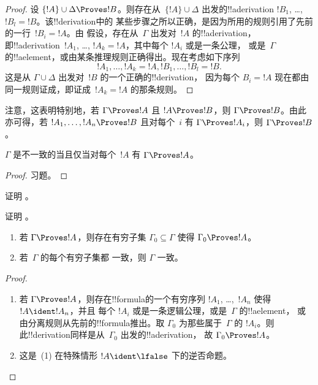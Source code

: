 \documentclass[../../../include/open-logic-section]{subfiles}
\begin{document}
\begin{proof}
  设 $\{!A\} \cup \Delta \Proves !B$。则存在从~$\{!A\} \cup
  \Delta$ 出发的!!a{derivation} $!B_1$, \dots, $!B_l = !B$。该!!{derivation}中的
  某些步骤之所以正确，是因为所用的规则引用了先前的一行~$!B_i = !A$。由
  假设，存在从~$\Gamma$ 出发对~$!A$ 的!!a{derivation}，即!!a{derivation}~$!A_1$, \dots, $!A_k = !A$，其中每个 $!A_i$ 或是一条公理，
  或是~$\Gamma$ 的!!a{element}，或由某条推理规则正确得出。现在考虑如下序列
  \[
  !A_1, \dots, !A_k = !A, !B_1, \dots, !B_l = !B.
  \]
  这是从 $\Gamma \cup \Delta$ 出发对~$!B$ 的一个正确的!!{derivation}，
  因为每个 $B_i = !A$ 现在都由同一规则证成，即证成~$!A_k = !A$ 的那条规则。
\end{proof}

注意，这表明特别地，若 $\Gamma \Proves !A$ 且 $!A
\Proves !B$，则 $\Gamma \Proves !B$。由此亦可得，若 $!A_1,
\dots, !A_n \Proves !B$ 且对每个~$i$ 有 $\Gamma \Proves !A_i$，则
$\Gamma \Proves !B$。

\begin{prop}
$\Gamma$ 是不一致的当且仅当对每个~$!A$ 有 $\Gamma \Proves !A$。
\end{prop}

\begin{proof}
习题。
\end{proof}

\begin{prob}
证明 。
\end{prob}
\tagendprob

\begin{prob}
证明 。
\end{prob}
\tagendprob

\begin{prop}[紧致性]
  \begin{enumerate}
  \item 若 $\Gamma \Proves !A$，则存在有穷子集 $\Gamma_0
    \subseteq \Gamma$ 使得 $\Gamma_0 \Proves !A$。
  \item 若~$\Gamma$ 的每个有穷子集都
    一致，则 $\Gamma$ 一致。
  \end{enumerate}
\end{prop}

\begin{proof}
  \begin{enumerate}
    \item 若 $\Gamma \Proves !A$，则存在!!{formula}的一个有穷序列
      $!A_1$, \dots,~$!A_n$ 使得 $!A \ident !A_n$，并且
      每个 $!A_i$ 或是一条逻辑公理，或是~$\Gamma$ 的!!a{element}，
      或由分离规则从先前的!!{formula}推出。取
      $\Gamma_0$ 为那些属于~$\Gamma$ 的 $!A_i$。则此!!{derivation}同样是从~$\Gamma_0$ 出发的!!a{derivation}，
      故 $\Gamma_0 \Proves !A$。
    \item 这是~(1) 在特殊情形 $!A
      \ident \lfalse$ 下的逆否命题。
\end{enumerate}
\end{proof}
\end{document}
